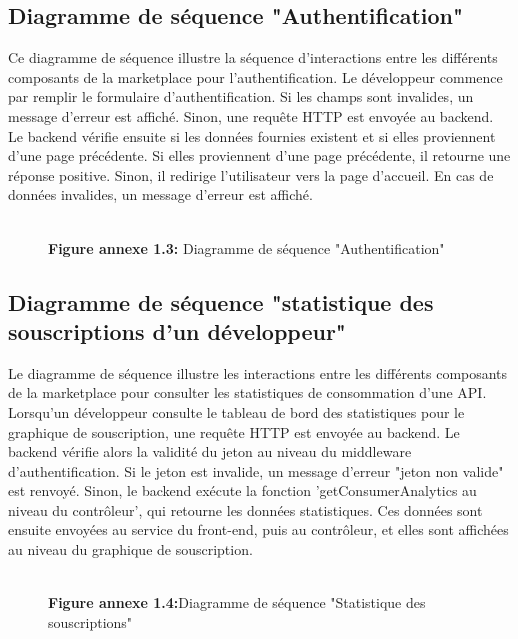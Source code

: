  \subsection{Diagramme de séquence "Authentification"}
 Ce diagramme de séquence illustre la séquence d'interactions entre les différents composants de la marketplace pour  l'authentification. Le développeur commence par remplir le formulaire \sloppy d'authentification. Si les champs sont invalides, un message d'erreur est affiché. Sinon, une requête HTTP est envoyée au backend. Le backend vérifie ensuite si les données fournies existent et si elles proviennent d'une page précédente. Si elles proviennent d'une page précédente, il retourne une réponse positive. Sinon, il redirige l'utilisateur vers la page d'accueil. En cas de données invalides, un message d'erreur est affiché.
 \begin{figure}[H]
    \centering
    {\\\textbf{Figure annexe 1.3:} Diagramme de séquence "Authentification"}
    \label{fig:logo_tt}
\end{figure}
\pagebreak


\subsection{Diagramme de séquence "statistique des souscriptions d'un développeur"}
Le diagramme de séquence illustre les interactions entre les différents composants de la marketplace pour consulter les statistiques de consommation d'une API. \\
Lorsqu'un développeur consulte le tableau de bord des statistiques pour le graphique de souscription, une requête HTTP est envoyée au backend. Le backend vérifie alors la validité du jeton au niveau du middleware d'authentification. Si le jeton est invalide, un message d'erreur "jeton non valide" est renvoyé. Sinon, le backend exécute la fonction 'getConsumerAnalytics au niveau du contrôleur', qui retourne les données statistiques. Ces données sont ensuite envoyées au service du front-end, puis au contrôleur, et elles sont affichées au niveau du graphique de souscription. 
\begin{figure}[H]
    \centering
    {\\\textbf{Figure annexe 1.4:}Diagramme de séquence "Statistique des souscriptions"    }
    \label{fig:logo_tt}
\end{figure}
 \pagebreak

